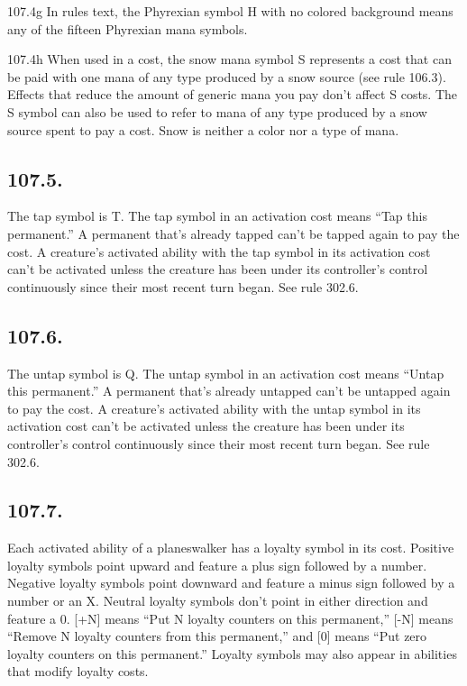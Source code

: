 107.4g In rules text, the Phyrexian symbol {H} with no colored background means any of the fifteen Phyrexian mana symbols.

107.4h When used in a cost, the snow mana symbol {S} represents a cost that can be paid with one mana of any type produced by a snow source (see rule 106.3). Effects that reduce the amount of generic mana you pay don’t affect {S} costs. The {S} symbol can also be used to refer to mana of any type produced by a snow source spent to pay a cost. Snow is neither a color nor a type of mana.

\subsection*{107.5.}
The tap symbol is {T}. The tap symbol in an activation cost means “Tap this permanent.” A permanent that’s already tapped can’t be tapped again to pay the cost. A creature’s activated ability with the tap symbol in its activation cost can’t be activated unless the creature has been under its controller’s control continuously since their most recent turn began. See rule 302.6.

\subsection*{107.6.}
The untap symbol is {Q}. The untap symbol in an activation cost means “Untap this permanent.” A permanent that’s already untapped can’t be untapped again to pay the cost. A creature’s activated ability with the untap symbol in its activation cost can’t be activated unless the creature has been under its controller’s control continuously since their most recent turn began. See rule 302.6.

\subsection*{107.7.}
Each activated ability of a planeswalker has a loyalty symbol in its cost. Positive loyalty symbols point upward and feature a plus sign followed by a number. Negative loyalty symbols point downward and feature a minus sign followed by a number or an X. Neutral loyalty symbols don’t point in either direction and feature a 0. [+N] means “Put N loyalty counters on this permanent,” [-N] means “Remove N loyalty counters from this permanent,” and [0] means “Put zero loyalty counters on this permanent.” Loyalty symbols may also appear in abilities that modify loyalty costs.

